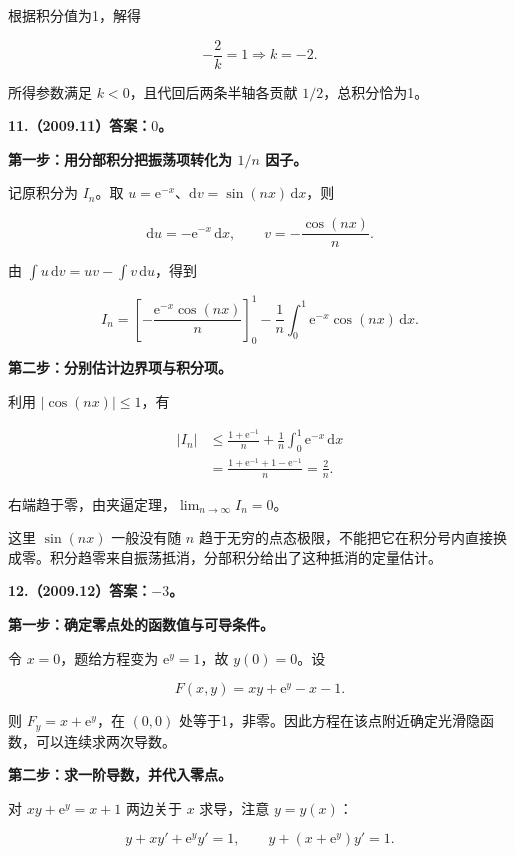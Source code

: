 \documentclass[UTF8,11pt,fontset=windows]{ctexart}
\begin{document}
根据积分值为1，解得

$$
-\frac2k=1\Longrightarrow\boxed{k=-2}.
$$

所得参数满足 $k<0$，且代回后两条半轴各贡献 $1/2$，总积分恰为1。

\clearpage

\textbf{11.（2009.11）答案：$0$。}

\textbf{第一步：用分部积分把振荡项转化为 $1/n$ 因子。}

记原积分为 $I_n$。取 $u=\mathrm e^{-x}$、$\mathrm dv=\sin(nx)\,\mathrm dx$，则

$$
\mathrm du=-\mathrm e^{-x}\,\mathrm dx,
\qquad v=-\frac{\cos(nx)}n.
$$

由 $\int u\,\mathrm dv=uv-\int v\,\mathrm du$，得到

$$
I_n=\left[-\frac{\mathrm e^{-x}\cos(nx)}n\right]_0^1
-\frac1n\int_0^1\mathrm e^{-x}\cos(nx)\,\mathrm dx.
$$

\textbf{第二步：分别估计边界项与积分项。}

利用 $|\cos(nx)|\le1$，有

$$
\begin{aligned}
|I_n|
&\le\frac{1+\mathrm e^{-1}}n
+\frac1n\int_0^1\mathrm e^{-x}\,\mathrm dx\\
&=\frac{1+\mathrm e^{-1}+1-\mathrm e^{-1}}n
=\frac2n.
\end{aligned}
$$

右端趋于零，由夹逼定理，$\boxed{\lim_{n\to\infty}I_n=0}$。

这里 $\sin(nx)$ 一般没有随 $n$ 趋于无穷的点态极限，不能把它在积分号内直接换成零。积分趋零来自振荡抵消，分部积分给出了这种抵消的定量估计。

\clearpage

\textbf{12.（2009.12）答案：$-3$。}

\textbf{第一步：确定零点处的函数值与可导条件。}

令 $x=0$，题给方程变为 $\mathrm e^y=1$，故 $y(0)=0$。设

$$
F(x,y)=xy+\mathrm e^y-x-1.
$$

则 $F_y=x+\mathrm e^y$，在 $(0,0)$ 处等于1，非零。因此方程在该点附近确定光滑隐函数，可以连续求两次导数。

\textbf{第二步：求一阶导数，并代入零点。}

对 $xy+\mathrm e^y=x+1$ 两边关于 $x$ 求导，注意 $y=y(x)$：

$$
y+xy'+\mathrm e^y y'=1,
\qquad y+(x+\mathrm e^y)y'=1.
$$
\end{document}
